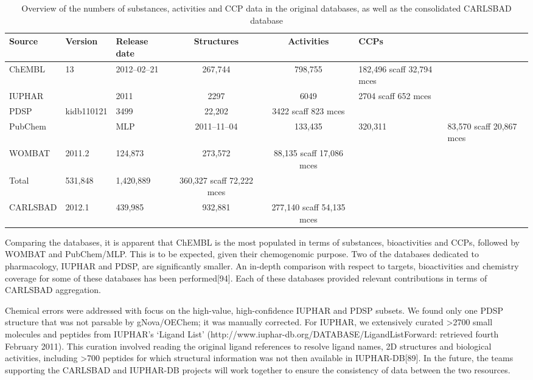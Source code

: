 \begin{table}[]
    \centering
    \begin{tabular}{lllccl}
    \hline
\textbf{Source} &	\textbf{Version} &	\textbf{Release date} &	\textbf{Structures} &	\textbf{Activities} &	\textbf{CCPs} \\
\hline
ChEMBL & 13 & 2012–02–21 & 267,744 & 798,755 & 182,496 scaff 32,794  mces  \\
IUPHAR & & 2011 & 2297 & 6049 & 2704 scaff 652 mces  \\
PDSP & kidb110121 &	3499 & 22,202 & 3422 scaff 823 mces  \\
PubChem & & MLP & 2011–11–04 & 133,435 & 320,311 & 83,570 scaff 20,867 mces \\
WOMBAT &	2011.2  &	 	124,873  &	273,572  &	88,135 scaff 17,086 mces  \\
Total 	  &	 	531,848  &	1,420,889  &	360,327 scaff 72,222 mces  \\
CARLSBAD  &	2012.1 	 & 	439,985  &	932,881  &	277,140 scaff 54,135 mces  \\
\hline
\end{tabular}
    \caption{Overview of the numbers of substances, activities and CCP data in the original databases, as well as the consolidated CARLSBAD database}
    \label{tab:cb_02}
\end{table}

Comparing the databases, it is apparent that ChEMBL is the most populated in terms of substances, bioactivities and CCPs, followed by WOMBAT and PubChem/MLP. This is to be expected, given their chemogenomic purpose. Two of the databases dedicated to pharmacology, IUPHAR and PDSP, are significantly smaller. An in-depth comparison with respect to targets, bioactivities and chemistry coverage for some of these databases has been performed[94]. Each of these databases provided relevant contributions in terms of CARLSBAD aggregation.

Chemical errors were addressed with focus on the high-value, high-confidence IUPHAR and PDSP subsets. We found only one PDSP structure that was not parsable by gNova/OEChem; it was manually corrected. For IUPHAR, we extensively curated >2700 small molecules and peptides from IUPHAR’s ‘Ligand List’ (http://www.iuphar-db.org/DATABASE/LigandListForward: retrieved fourth February 2011). This curation involved reading the original ligand references to resolve ligand names, 2D structures and biological activities, including >700 peptides for which structural information was not then available in IUPHAR-DB[89]. In the future, the teams supporting the CARLSBAD and IUPHAR-DB projects will work together to ensure the consistency of data between the two resources.

